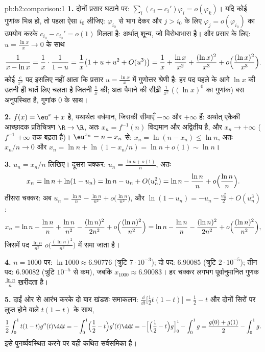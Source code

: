 \begin{solution}{pb:b2:comparison:1}
\textbf{1.} दोनों प्रसार घटाने पर: $\sum_i (c_i -
c_i')\varphi_i = o(\varphi_k)$। यदि कोई गुणांक भिन्न हो, तो
पहला ऐसा $i_0$ लीजिए: $\varphi_{i_0}$ से भाग देकर और $j > i_0$ के लिए $\varphi_j = o(\varphi_{i_0})$ का उपयोग करके $c_{i_0} -
c_{i_0}' = o(1)$
मिलता है: अर्थात् शून्य, जो विरोधाभास है। और प्रसार के लिए: $u = \frac{\ln x}x \to 0$ के साथ
\[
\frac{1}{x - \ln x} = \frac1x\cdot\frac{1}{1 - u}
= \frac1x\bigl(1 + u + u^2 + O(u^3)\bigr)
= \frac1x + \frac{\ln x}{x^2} + \frac{(\ln x)^2}{x^3} +
o\Bigl(\frac{(\ln x)^2}{x^3}\Bigr).
\]
कोई $\frac c{x^2}$ पद इसलिए नहीं आता कि प्रसार $u = \frac{\ln x}{x}$ में गुणोत्तर श्रेणी है: हर पद
पहले के आगे $\ln x$ की उतनी ही घातें लिए चलता है जितनी $\frac1x$ की; अतः पैमाने
की सीढ़ी $\frac1{x^2}$ ($(\ln x)^0$ का गुणांक) बस अनुपस्थित है, गुणांक $0$ के साथ।

\textbf{2.} $f(x) = \eu^x + x$  है, यथार्थतः वर्धमान, जिसकी सीमाएँ $-\infty$ और $+\infty$ हैं:
अर्थात् एकैकी आच्छादक प्रतिचित्रण $\R \to \R$, अतः $x_n = f^{-1}(n)$ विद्यमान और अद्वितीय है,
और $x_n \to +\infty$ ($f^{-1}$ $+\infty$ तक बढ़ता है)। $\eu^{x_n} = n - x_n$ से: $x_n = \ln(n - x_n) \leq \ln n$, अतः $x_n/n \to 0$ और $x_n = \ln n + \ln(1 - x_n/n) = \ln n + o(1)
\sim \ln n$।

\textbf{3.} $u_n = x_n/n$ लिखिए। दूसरा चक्कर: $u_n = \frac{\ln n
+ o(1)}{n}$, अतः
\[
x_n = \ln n + \ln(1 - u_n) = \ln n - u_n + O(u_n^2)
= \ln n - \frac{\ln n}{n} + o\Bigl(\frac{\ln n}n\Bigr).
\]
तीसरा चक्कर: अब $u_n = \frac{\ln n}{n} - \frac{\ln n}{n^2} +
o\bigl(\frac{\ln n}{n^2}\bigr)$, और $\ln(1 - u_n) = -u_n -
\frac{u_n^2}2 + O(u_n^3)$:
\[
x_n = \ln n - \frac{\ln n}n + \frac{\ln n}{n^2}
- \frac{(\ln n)^2}{2n^2} + o\Bigl(\frac{(\ln
n)^2}{n^2}\Bigr)
= \ln n - \frac{\ln n}{n} - \frac{(\ln n)^2}{2n^2} +
o\Bigl(\frac{(\ln n)^2}{n^2}\Bigr),
\]
जिसमें पद $\frac{\ln n}{n^2}$ $o\bigl(\frac{(\ln n)^2}{n^2}\bigr)$ में समा जाता है।

\textbf{4.} $n = 1000$ पर: $\ln 1000 \approx 6.90776$ (त्रुटि $7\cdot10^{-3}$); दो पद: $6.90085$ (त्रुटि $2\cdot10^{-5}$); तीन पद:
$6.90082$ (त्रुटि $10^{-5}$ से कम), जबकि $x_{1000} \approx 6.90083$। हर चक्कर लगभग पूर्वानुमानित गुणक $\frac{\ln n}{n}$
ख़रीदता है।

\textbf{5.} दाईं ओर से आरंभ करके दो बार खंडशः समाकलन: $\frac{\dd}{\dd t}\bigl[\tfrac12t(1-t)\bigr] = \tfrac12 -
t$ और दोनों
सिरों पर लुप्त होने वाले $t(1-t)$ के साथ,
\[
\frac12\int_0^1 t(1-t)g''(t)\dd t
= -\int_0^1\Bigl(\frac12 - t\Bigr)g'(t)\dd t
= -\Bigl[\Bigl(\frac12 - t\Bigr)g\Bigr]_0^1 - \int_0^1 g
= \frac{g(0) + g(1)}2 - \int_0^1 g .
\]
इसे पुनर्व्यवस्थित करने पर यही कथित सर्वसमिका है।


\end{solution}
